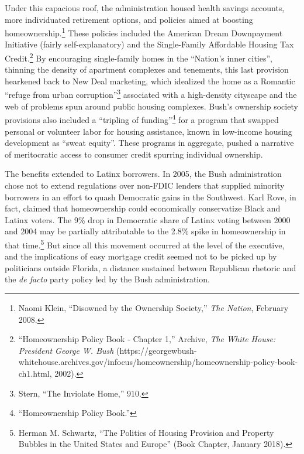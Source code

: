 \documentclass[12pt,oneside]{psthesis}
\begin{document}
Under this capacious roof, the administration housed health savings accounts, more individuated retirement options, and policies aimed at boosting homeownership.\footnote{Naomi Klein, ``Disowned by the Ownership Society,'' \emph{The Nation}, February 2008.}
These policies included the American Dream Downpayment Initiative (fairly self-explanatory) and the Single-Family Affordable Housing Tax Credit.\footnote{``Homeownership Policy Book - Chapter 1,'' Archive, \emph{The White House: President George W. Bush} (https://georgewbush-whitehouse.archives.gov/infocus/homeownership/homeownership-policy-book-\\ch1.html, 2002).}
By encouraging single-family homes in the ``Nation's inner cities'', thinning the density of apartment complexes and tenements, this last provision hearkened back to New Deal marketing, which idealized the home as a Romantic ``refuge from urban corruption''\footnote{Stern, ``The Inviolate Home,'' 910.} associated with a high-density cityscape and the web of problems spun around public housing complexes.
Bush's ownership society provisions also included a ``tripling of funding''\footnote{``Homeownership Policy Book.''} for a program that swapped personal or volunteer labor for housing assistance, known in low-income housing development as ``sweat equity''.
These programs in aggregate, pushed a narrative of meritocratic access to consumer credit spurring individual ownership.

The benefits extended to Latinx borrowers.
In 2005, the Bush administration chose not to extend regulations over non-FDIC lenders that supplied minority borrowers in an effort to quash Democratic gains in the Southwest.
Karl Rove, in fact, claimed that homeownership could economically conservatize Black and Latinx voters.
The 9\% drop in Democratic share of Latinx voting between 2000 and 2004 may be partially attributable to the 2.8\% spike in homeownership in that time.\footnote{Herman M. Schwartz, ``The Politics of Housing Provision and Property Bubbles in the United States and Europe'' (Book Chapter, January 2018).}
But since all this movement occurred at the level of the executive, and the implications of easy mortgage credit seemed not to be picked up by politicians outside Florida, a distance sustained between Republican rhetoric and the \emph{de facto} party policy led by the Bush administration.
\end{document}
